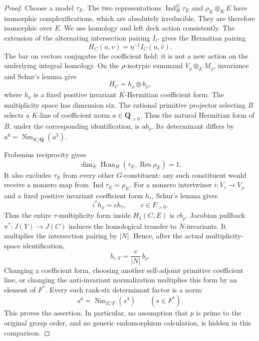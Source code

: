 \begin{proof}
Choose a model $\tau_E$.  The two representations
$\operatorname{Ind}_H^G\tau_E$ and $\rho_K\otimes_KE$ have
isomorphic complexifications, which are absolutely irreducible.
They are therefore isomorphic over $E$.
We use homology and left deck action consistently.  The extension
of the alternating intersection pairing $I_C$ gives the Hermitian
pairing
\[
                  H_C(u,v)=\eta^{-1}I_C(u,\bar v).
 \tag{PD.2}
\]
The bar on vectors conjugates the coefficient field; it is not
a new action on the underlying integral homology.
On the $\rho$-isotypic summand
$V_\rho\otimes_E M_\rho$, invariance and Schur's lemma give
\[
                         H_C=h_\rho\otimes b_\rho,
 \tag{PD.3}
\]
where $h_\rho$ is a fixed positive invariant $K$-Hermitian
coefficient form.  The multiplicity space has dimension six.
The rational primitive projector selecting $B$ selects a
$K$-line of coefficient norm $a\in\mathbf Q_{>0}$.
Thus the natural Hermitian form of $B$, under the corresponding
identification, is $a b_\rho$.  Its determinant differs by
$a^6=\operatorname{Nm}_{K/\mathbf Q}(a^3)$.

Frobenius reciprocity gives
\[
 \dim_E\operatorname{Hom}_H
          (\tau_E,\operatorname{Res}\rho_E)=1.
 \tag{PD.4}
\]
It also excludes $\tau_E$ from every other $G$-constituent:
any such constituent would receive a nonzero map from
$\operatorname{Ind}\tau_E=\rho_E$.
For a nonzero intertwiner $i:V_\tau\to V_\rho$ and a fixed
positive invariant coefficient form $h_\tau$, Schur's lemma gives
\[
                       i^*h_\rho=c h_\tau,\qquad c\in F_{>0}.
 \tag{PD.5}
\]
Thus the entire $\tau$-multiplicity form inside $H_1(C,E)$ is
$c b_\rho$.  Jacobian pullback $\pi^*:J(Y)\to J(C)$ induces
the homological transfer to $N$-invariants.  It multiplies the
intersection pairing by $|N|$.  Hence, after the actual
multiplicity-space identification,
\[
                        b_{\tau,Y}=\frac{c}{|N|}\,b_\rho.
 \tag{PD.6}
\]
Changing a coefficient form, choosing another self-adjoint
primitive coefficient line, or changing the anti-invariant
normalization multiplies this form by an element of $F^*$.
Every such rank-six determinant factor is a norm:
\[
                 s^6=\operatorname{Nm}_{E/F}(s^3)
                 \qquad(s\in F^*).
 \tag{PD.7}
\]
This proves the assertion.  In particular, no assumption that
$p$ is prime to the original group order, and no generic
endomorphism calculation, is hidden in this comparison.
\end{proof}

